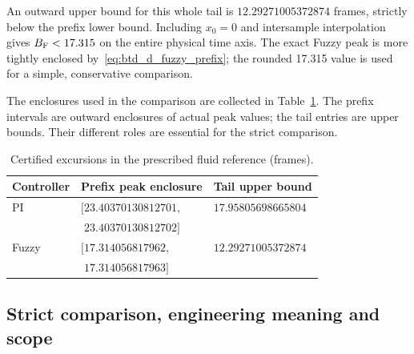 An outward upper bound for this whole tail is
$12.29271005372874$ frames, strictly below the prefix lower bound.
Including $x_0=0$ and intersample interpolation gives
$B_{\rm F}<17.315$ on the entire physical time axis. The exact Fuzzy
peak is more tightly enclosed by~\eqref{eq:btd_d_fuzzy_prefix}; the
rounded 17.315 value is used for a simple, conservative comparison.

The enclosures used in the comparison are collected in
Table~\ref{tab:btd_prefix_tail}. The prefix intervals are outward
enclosures of actual peak values; the tail entries are upper bounds.
Their different roles are essential for the strict comparison.
\begin{table}[t]
\caption{Certified excursions in the prescribed fluid reference (frames).}
\label{tab:btd_prefix_tail}
\centering\small
\begin{tabular}{@{}lll@{}}
\toprule
Controller & Prefix peak enclosure & Tail upper bound\\
\midrule
PI & $[23.40370130812701,$ & $17.95805698665804$\\
   & $\phantom{[}23.40370130812702]$ & \\
Fuzzy & $[17.314056817962,$ & $12.29271005372874$\\
      & $\phantom{[}17.314056817963]$ & \\
\bottomrule
\end{tabular}
\end{table}

\subsection{Strict comparison, engineering meaning and scope}
\label{subsec:btd_comparative}

